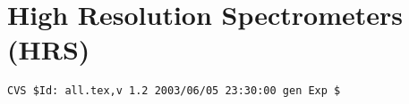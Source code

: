 \chapter{High Resolution Spectrometers (HRS)}
\graphicspath{{hrs/figs/}}
\renewcommand{\dirfig}[0]{hrs/figs}
\renewcommand{\dircur}[0]{hrs}


\newpage

\newpage

\newpage


%
%
{\small
\begin{verbatim}CVS $Id: all.tex,v 1.2 2003/06/05 23:30:00 gen Exp $\end{verbatim}
}
